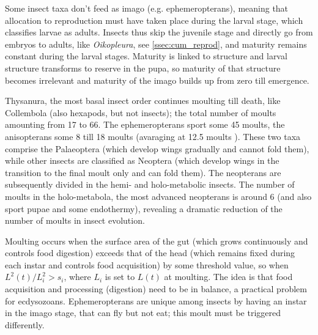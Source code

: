 Some insect taxa don't feed as imago (e.g. ephemeropterans), meaning that allocation to reproduction must have taken place during the larval stage, which classifies larvae as adults.
Insects thus skip the juvenile stage and directly go from embryos to adults, like \emph{Oikopleura}, see \ref{ssec:cum_reprod}, and maturity remains constant during the larval stages.
Maturity is linked to structure and larval structure transforms to reserve in the pupa, so maturity of that structure becomes irrelevant and maturity of the imago builds up from zero till emergence.

Thysanura, the most basal insect order continues moulting till death, like Collembola (also hexapods, but not insects);
the total number of moults amounting from 17 to 66. 
The ephemeropterans sport some 45 moults, the anisopterans some 8 till 18 moults (avaraging at 12.5 moults \cite{Corb2002}). 
These two taxa comprise the Palaeoptera (which develop wings gradually and cannot fold them), while other insects are classified as Neoptera (which develop wings in the transition to the final moult only and can fold them).
The neopterans are subsequently divided in the hemi- and holo-metabolic insects.
The number of moults in the holo-metabola, the most advanced neopterans is around 6 (and also sport pupae and some endothermy), revealing a dramatic reduction of the number of moults in insect evolution.

Moulting occurs when the surface area of the gut (which grows continuously and controls food digestion) exceeds that of the head (which remains fixed during each instar and controls food acquisition) by some threshold value, so when $L^2(t)/ L_i^2 > s_i$, where $L_i$ is set to $L(t)$ at moulting.
The idea is that food acquisition and processing (digestion) need to be in balance, a practical problem for ecdysozoans.
Ephemeropterans are unique among insects by having an instar in the imago stage, that can fly but not eat;
this moult must be triggered differently.


